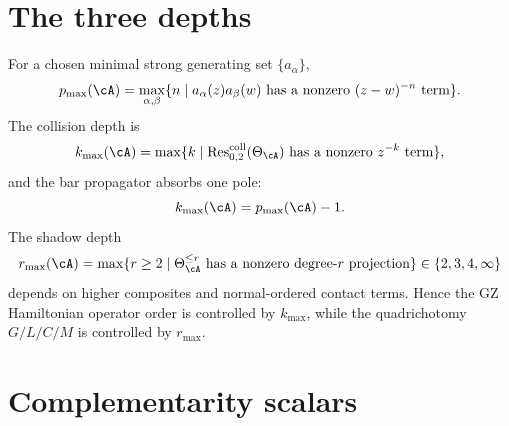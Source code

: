\section{The three depths}
\label{sec:master-concordance-three-invariants}

For a chosen minimal strong generating set $\{a_\alpha\}$,
\[
p_{\max}(\cA)
=\max_{\alpha,\beta}
\{n\mid a_\alpha(z)a_\beta(w)
\text{ has a nonzero }(z-w)^{-n}\text{ term}\}.
\]
The collision depth is
\[
k_{\max}(\cA)
=\max\{k\mid
\operatorname{Res}^{\mathrm{coll}}_{0,2}(\Theta_\cA)
\text{ has a nonzero }z^{-k}\text{ term}\},
\]
and the bar propagator absorbs one pole:
\[
k_{\max}(\cA)=p_{\max}(\cA)-1.
\]
The shadow depth
\[
r_{\max}(\cA)=
\max\{r\geq2\mid
\Theta_\cA^{\leq r}
\text{ has a nonzero degree-}r\text{ projection}\}
\in\{2,3,4,\infty\}
\]
depends on higher composites and normal-ordered contact terms.  Hence
the GZ Hamiltonian operator order is controlled by $k_{\max}$, while
the quadrichotomy $G/L/C/M$ is controlled by $r_{\max}$.

\section{Complementarity scalars}
\label{sec:master-concordance-complementarity-scalars}

